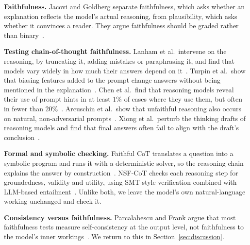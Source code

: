 
\textbf{Faithfulness.} Jacovi and Goldberg separate faithfulness, which asks whether
an explanation reflects the model's actual reasoning, from plausibility, which asks
whether it convinces a reader. They argue faithfulness should be graded rather than
binary~\cite{jacovi2020}.

\textbf{Testing chain-of-thought faithfulness.} Lanham et al.\ intervene on the
reasoning, by truncating it, adding mistakes or paraphrasing it, and find that models
vary widely in how much their answers depend on it~\cite{lanham2023}. Turpin et al.\
show that biasing features added to the prompt change answers without being mentioned
in the explanation~\cite{turpin2023}. Chen et al.\ find that reasoning models reveal
their use of prompt hints in at least 1\% of cases where they use them, but often in
fewer than 20\%~\cite{chen2025}. Arcuschin et al.\ show that unfaithful reasoning also
occurs on natural, non-adversarial prompts~\cite{arcuschin2025}. Xiong et al.\ perturb
the thinking drafts of reasoning models and find that final answers often fail to
align with the draft's conclusion~\cite{xiong2025}.

\textbf{Formal and symbolic checking.} Faithful CoT translates a question into a
symbolic program and runs it with a deterministic solver, so the reasoning chain
explains the answer by construction~\cite{lyu2023}. NSF-CoT checks each reasoning step
for groundedness, validity and utility, using SMT-style verification combined with
LLM-based entailment~\cite{pramanik2026}. Unlike both, we leave the model's own
natural-language working unchanged and check it.

\textbf{Consistency versus faithfulness.} Parcalabescu and Frank argue that most
faithfulness tests measure self-consistency at the output level, not faithfulness to
the model's inner workings~\cite{parcalabescu2024}. We return to this in
Section~\ref{sec:discussion}.

